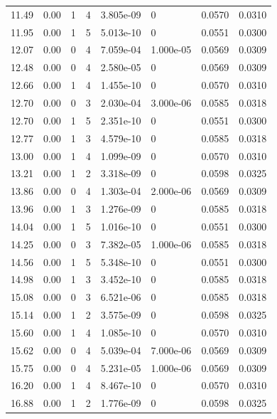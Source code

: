 \documentclass[preview]{standalone}
\begin{document}
{{{\begin{tabular}{L{1.2cm}C{1.2cm} C{0.3cm}C{0.5cm} C{1.4cm}C{1.4cm} C{1.4cm}C{1.4cm}}
  11.49  &  0.00  & 1     &  4 &  3.805e-09  & 0  & 0.0570 &  0.0310   \\ 
  11.95  &  0.00  & 1     &  5 &  5.013e-10  & 0  & 0.0551 &  0.0300   \\ 
  12.07  &  0.00  & 0     &  4 &  7.059e-04  & 1.000e-05  & 0.0569 &  0.0309   \\ 
  12.48  &  0.00  & 0     &  4 &  2.580e-05  & 0  & 0.0569 &  0.0309   \\ 
  12.66  &  0.00  & 1     &  4 &  1.455e-10  & 0  & 0.0570 &  0.0310   \\ 
  12.70  &  0.00  & 0     &  3 &  2.030e-04  & 3.000e-06  & 0.0585 &  0.0318   \\ 
  12.70  &  0.00  & 1     &  5 &  2.351e-10  & 0  & 0.0551 &  0.0300   \\ 
  12.77  &  0.00  & 1     &  3 &  4.579e-10  & 0  & 0.0585 &  0.0318   \\ 
  13.00  &  0.00  & 1     &  4 &  1.099e-09  & 0  & 0.0570 &  0.0310   \\ 
  13.21  &  0.00  & 1     &  2 &  3.318e-09  & 0  & 0.0598 &  0.0325   \\ 
  13.86  &  0.00  & 0     &  4 &  1.303e-04  & 2.000e-06  & 0.0569 &  0.0309   \\ 
  13.96  &  0.00  & 1     &  3 &  1.276e-09  & 0  & 0.0585 &  0.0318   \\ 
  14.04  &  0.00  & 1     &  5 &  1.016e-10  & 0  & 0.0551 &  0.0300   \\ 
  14.25  &  0.00  & 0     &  3 &  7.382e-05  & 1.000e-06  & 0.0585 &  0.0318   \\ 
  14.56  &  0.00  & 1     &  5 &  5.348e-10  & 0  & 0.0551 &  0.0300   \\ 
  14.98  &  0.00  & 1     &  3 &  3.452e-10  & 0  & 0.0585 &  0.0318   \\ 
  15.08  &  0.00  & 0     &  3 &  6.521e-06  & 0  & 0.0585 &  0.0318   \\ 
  15.14  &  0.00  & 1     &  2 &  3.575e-09  & 0  & 0.0598 &  0.0325   \\ 
  15.60  &  0.00  & 1     &  4 &  1.085e-10  & 0  & 0.0570 &  0.0310   \\ 
  15.62  &  0.00  & 0     &  4 &  5.039e-04  & 7.000e-06  & 0.0569 &  0.0309   \\ 
  15.75  &  0.00  & 0     &  4 &  5.231e-05  & 1.000e-06  & 0.0569 &  0.0309   \\ 
  16.20  &  0.00  & 1     &  4 &  8.467e-10  & 0  & 0.0570 &  0.0310   \\ 
  16.88  &  0.00  & 1     &  2 &  1.776e-09  & 0  & 0.0598 &  0.0325   \\ 

\end{tabular}}}}
\end{document}
